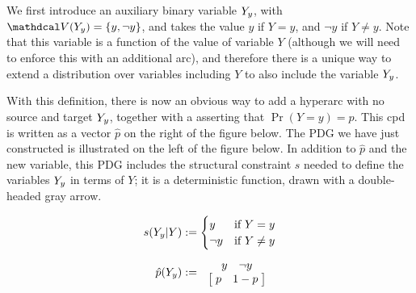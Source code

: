 We first introduce an auxiliary binary variable
${Y_y}$, with $\V(\Yyshort) = \{y, \lnot y\}$,
    and takes the value $y$ if $Y=y$, and $\lnot y$ if $Y \ne y$.
Note that this variable is a function of the value of variable $Y$
(although we will need to enforce this with an additional arc), and
therefore there is a unique way to extend a distribution over
variables including $Y$ to also include the variable ${Y_y}$.

With this definition, there is now an obvious way to add a hyperarc with no source and
    target ${Y_y}$, together with a asserting that $\Pr(Y{=}y)=p$.
This cpd is written as a vector $\hat p$ on the right of the figure below.
The PDG we have just constructed is illustrated on the left of the figure below.
In addition to $\hat p$ and the new variable, this PDG
    includes the structural constraint $s$ needed to define the variables
    ${Y_y}$ in terms of $Y$; it is a deterministic function,
    drawn with a double-headed gray arrow.

\begin{center}
    \hspace{1cm}
    \begin{minipage}{0.3\textwidth}
        \begin{align*}
            s({Y_y}|Y) &:= \begin{cases}
                y & \text{if $Y=y$} \\
                \lnot y & \text{if $Y\ne y$} \\
            \end{cases}\\[1ex]
            \hat p({Y_y}) &:= ~~\begin{matrix}
                  \begin{matrix} y & \lnot y \end{matrix} \\
                    \begin{bmatrix}
                        \;p & 1-p \;
                    \end{bmatrix}
            \end{matrix}
        \end{align*}
    \end{minipage}
\end{center}
    \medskip

